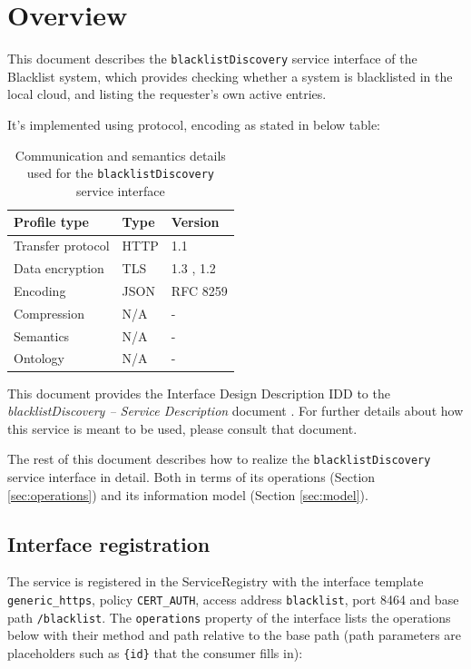 \documentclass[a4paper]{arrowhead}
\begin{document}
\section{Overview}
\label{sec:overview}

This document describes the \texttt{blacklistDiscovery} service interface of the Blacklist system, which provides checking whether a system is blacklisted in the local cloud, and listing the requester's own active entries.

It's implemented using protocol, encoding as stated in below table:
\begin{table}[ht!]
  \centering
  \begin{tabular}{|l|l|l|}
    \hline
    \rowcolor{gray!33} Profile type & Type & Version \\ \hline
    Transfer protocol & HTTP & 1.1 \cite{rfc9112} \\ \hline
    Data encryption & TLS & 1.3 \cite{rfc8446}, 1.2 \cite{rfc5246} \\ \hline
    Encoding & JSON & RFC 8259 \cite{rfc8259} \\ \hline
    Compression & N/A & - \\ \hline
    Semantics & N/A & - \\ \hline
    Ontology & N/A & - \\ \hline
  \end{tabular}
  \caption{Communication and semantics details used for the \texttt{blacklistDiscovery} service interface}
  \label{tab:comunication_semantics_profile}
\end{table}

This document provides the Interface Design Description IDD to the \textit{blacklistDiscovery -- Service Description} document \cite{bl-blacklistDiscovery-sd}.
For further details about how this service is meant to be used, please consult that document.

The rest of this document describes how to realize the \texttt{blacklistDiscovery} service
interface in detail. Both in terms of its operations (Section \ref{sec:operations}) and its information model (Section \ref{sec:model}).

\subsection{Interface registration}

The service is registered in the ServiceRegistry with the interface template \texttt{generic\_\allowbreak{}https}, policy \texttt{CERT\_\allowbreak{}AUTH}, access address \texttt{blacklist}, port 8464 and base path \texttt{/\allowbreak{}blacklist}. The \texttt{operations} property of the interface lists the operations below with their method and path relative to the base path (path parameters are placeholders such as \texttt{\{id\}} that the consumer fills in):
\end{document}
